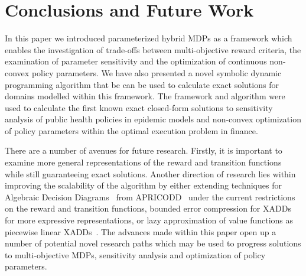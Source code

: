 \section{Conclusions and Future Work}
\label{sec:conclusion}

In this paper we introduced parameterized hybrid MDPs as a framework which enables the investigation of trade-offs between multi-objective reward criteria, the examination of parameter sensitivity and the optimization of continuous non-convex policy parameters. We have also presented a novel symbolic dynamic programming algorithm that be can be used to calculate exact solutions for domains modelled within this framework. The framework and algorithm were used to calculate the first known exact closed-form solutions to sensitivity analysis of public health policies in epidemic models and non-convex optimization of policy parameters within the optimal execution problem in finance.

There are a number of avenues for future research. Firstly, it is important to examine more general representations of the reward and transition functions while still guaranteeing exact solutions. Another direction of research lies within improving the scalability of the algorithm by either extending techniques for Algebraic Decision Diagrams~\parencite{Bahar_JoFMiSD_1993} from APRICODD~\parencite{St-Aubin_NIPS_2000} under the current restrictions on the reward and transition functions, bounded error compression for 
XADDs~\parencite{Vianna_UAI_2013} for more expressive representations, or lazy approximation of value functions as piecewise linear XADDs~\parencite{Li_AAAI_2005}. The advances made within this paper open up a number of potential novel research paths which may be used to progress solutions to multi-objective MDPs, sensitivity analysis and optimization of policy parameters.